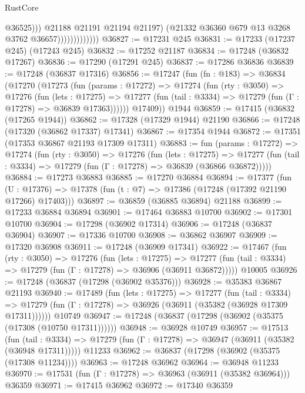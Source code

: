 \begin{lexlean}{RustCore}
\begin{coremodule}
                                    @36525)))
                              @21188
                              @21191
                              @21194
                              @21197)
                            (@21332 @36360 @679 @13 @3268 @3762 @36657)))))))))))))
@36827 := @17231 @245
@36831 := @17233 (@17237 @245) (@17243 @245)
@36832 := @17252 @21187
@36834 := @17248 (@36832 @17267)
@36836 := @17290 (@17291 @245)
@36837 := @17286 @36836
@36839 := @17248 (@36837 @17316)
@36856 := @17247
    (fun (fn : @183) =>
    @36834
      (@17270
        (@17273
          (fun (params : @17272) =>
          @17274
            (fun (rty : @3050) =>
            @17276
              (fun (lets : @17275) =>
              @17277 (fun (tail : @3334) => @17279 (fun (Γ : @17278) => @36839 @17363))))))
        @17409))
    @1944
@36859 := @17415 (@36832 (@17265 @1944))
@36862 := @17328 (@17329 @1944) @21190
@36866 := @17248 (@17320 (@36862 @17337) @17341)
@36867 := @17354 @1944
@36872 := @17351 (@17353 @36867 @21193 @17309 @17311)
@36883 := fun (params : @17272) =>
  @17274
    (fun (rty : @3050) =>
    @17276
      (fun (lets : @17275) =>
      @17277 (fun (tail : @3334) => @17279 (fun (Γ : @17278) => @36839 (@36866 @36872)))))
@36884 := @17273 @36883
@36885 := @17270 @36884
@36894 := @17377
    (fun (U : @17376) => @17378 (fun (t : @7) => @17386 (@17248 (@17392 @21190 @17266) @17403)))
@36897 := @36859 (@36885 @36894) @21188
@36899 := @17233 @36884 @36894
@36901 := @17464 @36883 @10700
@36902 := @17301 @10700
@36904 := @17298 (@36902 @17314)
@36906 := @17248 (@36837 @36904)
@36907 := @17336 @10700
@36908 := @36862 @36907
@36909 := @17320 @36908
@36911 := @17248 (@36909 @17341)
@36922 := @17467
    (fun (rty : @3050) =>
    @17276
      (fun (lets : @17275) =>
      @17277 (fun (tail : @3334) => @17279 (fun (Γ : @17278) => @36906 (@36911 @36872)))))
    @10005
@36926 := @17248 (@36837 (@17298 (@36902 @35376)))
@36928 := @35383 @36867 @21193
@36940 := @17489
    (fun (lets : @17275) =>
    @17277
      (fun (tail : @3334) =>
      @17279 (fun (Γ : @17278) => @36926 (@36911 (@35382 (@36928 @17309 @17311))))))
    @10749
@36947 := @17248 (@36837 (@17298 (@36902 (@35375 (@17308 (@10750 @17311))))))
@36948 := @36928 @10749
@36957 := @17513
    (fun (tail : @3334) => @17279 (fun (Γ : @17278) => @36947 (@36911 (@35382 (@36948 @17311)))))
    @11233
@36962 := @36837 (@17298 (@36902 (@35375 (@17308 @11234))))
@36963 := @17248 @36962
@36964 := @36948 @11233
@36970 := @17531 (fun (Γ : @17278) => @36963 (@36911 (@35382 @36964))) @36359
@36971 := @17415 @36962
@36972 := @17340 @36359

\end{coremodule}
\end{lexlean}
